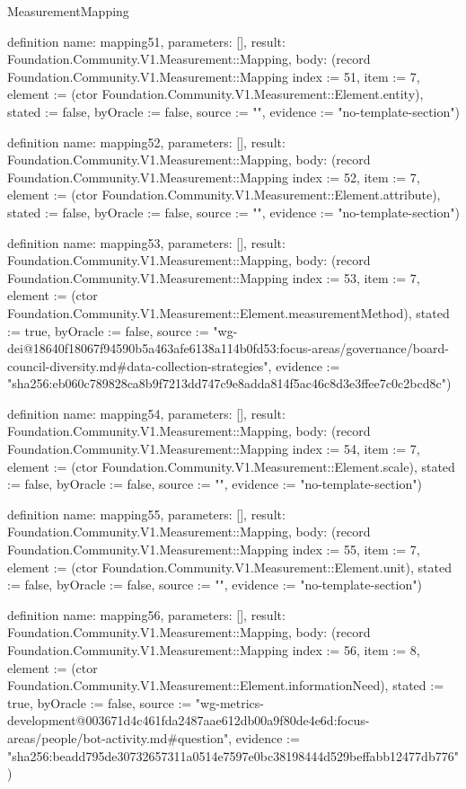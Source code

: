 \begin{lexlean}{MeasurementMapping}
\begin{semanticmodule}
definition{
  name: mapping51,
  parameters: [],
  result: Foundation.Community.V1.Measurement::Mapping,
  body: (record Foundation.Community.V1.Measurement::Mapping {index := 51, item := 7, element := (ctor Foundation.Community.V1.Measurement::Element.entity), stated := false, byOracle := false, source := "", evidence := "no-template-section"})
}

definition{
  name: mapping52,
  parameters: [],
  result: Foundation.Community.V1.Measurement::Mapping,
  body: (record Foundation.Community.V1.Measurement::Mapping {index := 52, item := 7, element := (ctor Foundation.Community.V1.Measurement::Element.attribute), stated := false, byOracle := false, source := "", evidence := "no-template-section"})
}

definition{
  name: mapping53,
  parameters: [],
  result: Foundation.Community.V1.Measurement::Mapping,
  body: (record Foundation.Community.V1.Measurement::Mapping {index := 53, item := 7, element := (ctor Foundation.Community.V1.Measurement::Element.measurementMethod), stated := true, byOracle := false, source := "wg-dei@18640f18067f94590b5a463afe6138a114b0fd53:focus-areas/governance/board-council-diversity.md#data-collection-strategies", evidence := "sha256:eb060c789828ca8b9f7213dd747c9e8adda814f5ac46c8d3e3ffee7c0c2bcd8c"})
}

definition{
  name: mapping54,
  parameters: [],
  result: Foundation.Community.V1.Measurement::Mapping,
  body: (record Foundation.Community.V1.Measurement::Mapping {index := 54, item := 7, element := (ctor Foundation.Community.V1.Measurement::Element.scale), stated := false, byOracle := false, source := "", evidence := "no-template-section"})
}

definition{
  name: mapping55,
  parameters: [],
  result: Foundation.Community.V1.Measurement::Mapping,
  body: (record Foundation.Community.V1.Measurement::Mapping {index := 55, item := 7, element := (ctor Foundation.Community.V1.Measurement::Element.unit), stated := false, byOracle := false, source := "", evidence := "no-template-section"})
}

definition{
  name: mapping56,
  parameters: [],
  result: Foundation.Community.V1.Measurement::Mapping,
  body: (record Foundation.Community.V1.Measurement::Mapping {index := 56, item := 8, element := (ctor Foundation.Community.V1.Measurement::Element.informationNeed), stated := true, byOracle := false, source := "wg-metrics-development@003671d4c461fda2487aae612db00a9f80de4e6d:focus-areas/people/bot-activity.md#question", evidence := "sha256:beadd795de30732657311a0514e7597e0bc38198444d529beffabb12477db776"})
}


\end{semanticmodule}
\end{lexlean}
